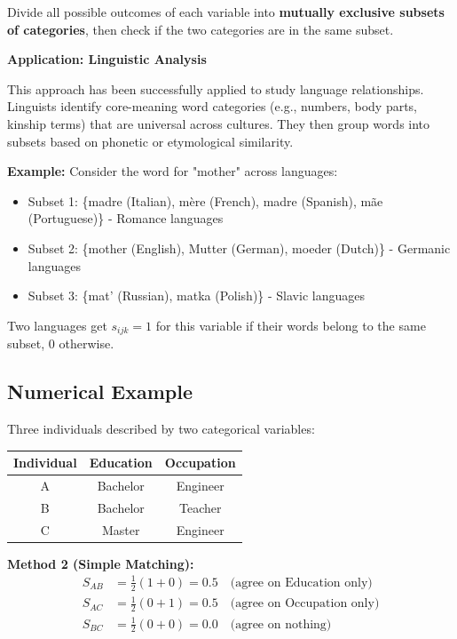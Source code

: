\documentclass[11pt]{article}
\begin{document}
Divide all possible outcomes of each variable into \textbf{mutually exclusive subsets of categories}, then check if the two categories are in the same subset.

\textbf{Application: Linguistic Analysis}

This approach has been successfully applied to study language relationships. Linguists identify core-meaning word categories (e.g., numbers, body parts, kinship terms) that are universal across cultures. They then group words into subsets based on phonetic or etymological similarity.

\textbf{Example:} Consider the word for "mother" across languages:
\begin{itemize}
    \item Subset 1: \{madre (Italian), mère (French), madre (Spanish), mãe (Portuguese)\} - Romance languages
    \item Subset 2: \{mother (English), Mutter (German), moeder (Dutch)\} - Germanic languages
    \item Subset 3: \{mat' (Russian), matka (Polish)\} - Slavic languages
\end{itemize}

Two languages get $s_{ijk} = 1$ for this variable if their words belong to the same subset, 0 otherwise.

\subsection{Numerical Example}

Three individuals described by two categorical variables:

\begin{center}
\begin{tabular}{c|cc}
Individual & Education & Occupation \\
\hline
A & Bachelor & Engineer \\
B & Bachelor & Teacher \\
C & Master & Engineer \\
\end{tabular}
\end{center}

\textbf{Method 2 (Simple Matching):}
\begin{align*}
S_{AB} &= \frac{1}{2}(1 + 0) = 0.5 \quad \text{(agree on Education only)} \\
S_{AC} &= \frac{1}{2}(0 + 1) = 0.5 \quad \text{(agree on Occupation only)} \\
S_{BC} &= \frac{1}{2}(0 + 0) = 0.0 \quad \text{(agree on nothing)}
\end{align*}
\end{document}
